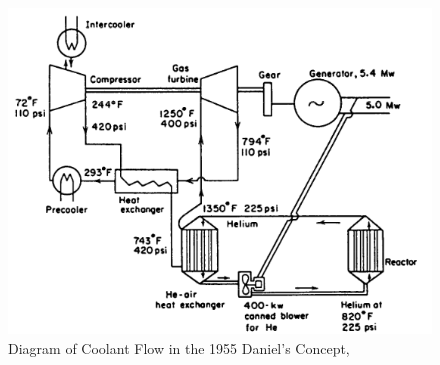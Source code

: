 \begin{figure}[h!]
\centering
\includegraphics[width=0.6\linewidth]{figures/daniels-2}
\caption{Diagram of Coolant Flow in the 1955 Daniel's Concept, \cite{simnad_early_1991}}
\label{fig:daniels-2}
\end{figure}